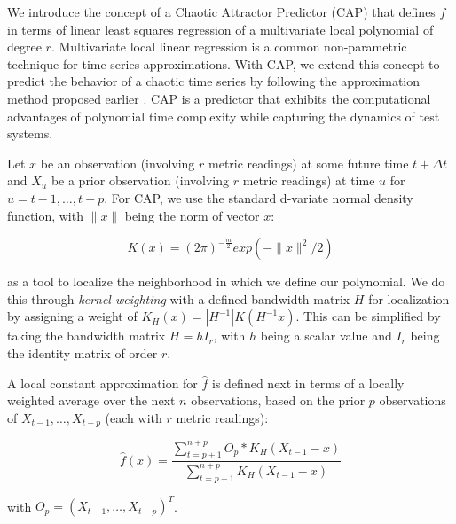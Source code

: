 \documentclass[times,10pt,finalversion]{usetex-v1}
\begin{document}
We introduce the concept of a Chaotic Attractor Predictor
(CAP) that defines $\hat{f}$ in terms of linear least squares
regression of a multivariate local polynomial of degree $r$.
Multivariate local linear regression is a common non-parametric
technique for time series approximations.  With CAP, we extend this
concept to predict the behavior of a chaotic time series by following
the approximation method proposed earlier \cite{Itoh1995}. CAP is a
predictor that exhibits the computational advantages of polynomial time
complexity while capturing the dynamics of test systems.

Let $x$ be an observation (involving $r$ metric readings) at some future
time $t+\Delta t$ and $X_{u}$ be a prior observation (involving $r$
metric readings) at time $u$ for $u=t-1,\dots,t-p$.  For CAP, we use the
standard d-variate normal density function, with $\|x\|$ being the norm
of vector $x$:
\begin{small}
{\setlength{\abovedisplayskip}{0pt plus 0pt minus 0pt}
 \setlength{\belowdisplayskip}{0pt plus 0pt minus 0pt}
  \begin{equation}
K(x)=(2\pi)^{-\frac{m}{2}}exp(-\|x\|^{2}/2)\nonumber
\end{equation}
}\end{small}
as a tool to localize the
neighborhood in which we define our polynomial.  We do this through
\textit{kernel weighting} with a defined bandwidth matrix $H$ for
localization by assigning a weight of $ K_{H}(x)=|H^{-1}|K(H^{-1}x)$.  This
can be simplified by taking the bandwidth matrix $H=hI_{r}$, with $h$
being a scalar value and $I_{r}$ being the identity matrix of order
$r$.

A local constant approximation for $\hat{f}$ is defined next
in terms of a locally weighted average \cite{Box1994} over
the next $n$ observations, based on the prior $p$ observations
of $X_{t-1}, \ldots, X_{t-p}$ (each with $r$ metric readings):
\begin{small}
{\setlength{\abovedisplayskip}{0pt plus 1pt minus 1pt}
 \setlength{\belowdisplayskip}{0pt plus 1pt minus 1pt}
  \begin{equation}
    \label{eq:localconst}
    \hat{f}(x)=\dfrac{\displaystyle\sum_{t=p+1}^{n+p}O_{p}*K_{H}(X_{t-1}-x)}{\displaystyle\sum_{t=p+1}^{n+p}K_{H}(X_{t-1}-x)}\nonumber
  \end{equation}
}
\end{small}
with $O_{p}=(X_{t-1},\ldots,X_{t-p})^{T}$.
 
\end{document}
